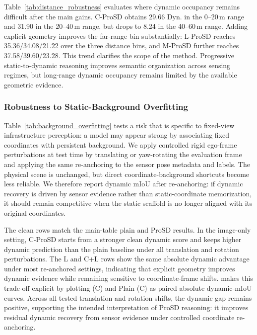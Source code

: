 Table~\ref{tab:distance_robustness} evaluates where dynamic occupancy remains
difficult after the main gains. C-ProSD obtains 29.66 Dyn. in the 0--20\,m
range and 31.90 in the 20--40\,m range, but drops to 8.24 in the 40--60\,m
range. Adding explicit geometry improves the far-range bin substantially:
L-ProSD reaches 35.36/34.08/21.22 over the three distance bins, and M-ProSD
further reaches 37.58/39.60/23.28. This trend clarifies the scope of the
method. Progressive static-to-dynamic reasoning improves semantic organization
across sensing regimes, but long-range dynamic occupancy remains limited by the
available geometric evidence.

\subsubsection{Robustness to Static-Background Overfitting}
Table~\ref{tab:background_overfitting} tests a risk that is specific to
fixed-view infrastructure perception: a model may appear strong by associating
fixed coordinates with persistent background. We apply controlled rigid
ego-frame perturbations at test time by translating or yaw-rotating the
evaluation frame and applying the same re-anchoring to the sensor pose metadata
and labels. The physical scene is unchanged, but direct coordinate-background
shortcuts become less reliable. We therefore report dynamic mIoU after
re-anchoring: if dynamic recovery is driven by sensor evidence rather than
static-coordinate memorization, it should remain competitive when the static
scaffold is no longer aligned with its original coordinates.

The clean rows match the main-table plain and ProSD results. In the image-only
setting, C-ProSD starts from a stronger clean dynamic score and keeps higher
dynamic prediction than the plain baseline under all translation and rotation
perturbations. The L and C+L rows show the same absolute dynamic advantage
under most re-anchored settings, indicating that explicit geometry improves
dynamic evidence while remaining sensitive to coordinate-frame shifts.
 makes this trade-off explicit by
plotting \nameplus{} (C) and Plain (C) as paired absolute dynamic-mIoU curves.
Across all tested translation and rotation shifts, the dynamic gap remains
positive, supporting the intended interpretation of ProSD reasoning: it improves
residual dynamic recovery from sensor evidence under controlled coordinate
re-anchoring.
